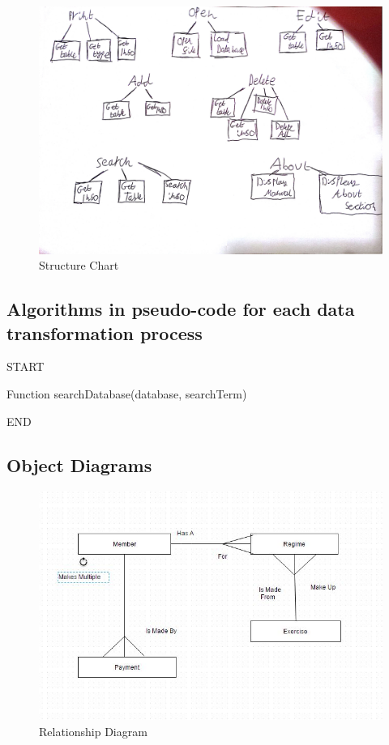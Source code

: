 \begin{figure}[H]
    \includegraphics[width=\textwidth]{StructureChart2.jpg}
    \caption{Structure Chart} \label{fig:StructureChart}
\end{figure}



\subsection{Algorithms in pseudo-code for each data transformation process}

\begin{python}

START

Function searchDatabase(database, searchTerm)
    


END

\end{python}


\subsection{Object Diagrams}

\begin{figure}[H]
    \includegraphics[width=\textwidth]{RelationshipDiagram1.jpg}
    \caption{Relationship Diagram} \label{fig: Relationship Diagram}
\end{figure}

